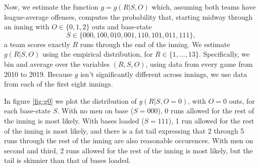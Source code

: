 \documentclass[12pt]{article}
\begin{document}
Now, we estimate the function $g=g(R|S,O)$ which, assuming both teams have league-average offenses, computes the probability that, starting midway through an inning with $O \in \{0,1,2\}$ outs and base-state 
$$S \in \{000,100,010,001,110,101,011,111\},$$
a team scores exactly $R$ runs through the end of the inning. We estimate $g(R|S,O)$ using the empirical distribution, for $R \in \{1,...,13\}$. Specifically, we bin and average over the variables $(R,S,O)$, using data from every game from 2010 to 2019. Because $g$ isn't significantly different across innings, we use data from each of the first eight innings.

In figure \ref{fig:g0} we plot the distribution of $g(R|S,O=0)$, with $O=0$ outs, for each base-state $S$. With no men on base ($S=000$), 0 runs allowed for the rest of the inning is most likely. With bases loaded ($S=111$), 1 run allowed for the rest of the inning is most likely, and there is a fat tail expressing that 2 through 5 runs through the rest of the inning are also reasonable occurences. With men on second and third, 2 runs allowed for the rest of the inning is most likely, but the tail is skinnier than that of bases loaded. 






\end{document}
